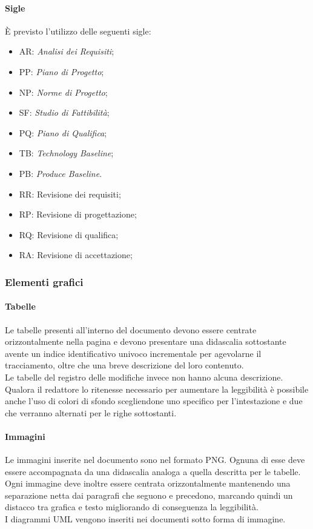 		\paragraph{Sigle} \Spazio
		È previsto l’utilizzo delle seguenti sigle:
		\begin{itemize}
			\item AR: \textit{Analisi dei Requisiti};
			\item PP: \textit{Piano di Progetto};
			\item NP: \textit{Norme di Progetto};
			\item SF: \textit{Studio di Fattibilità};
			\item PQ: \textit{Piano di Qualifica};
			\item TB: \emph{Technology Baseline};
			\item PB: \emph{Produce Baseline}.
			
			
\item RR: Revisione dei requisiti;
			\item RP: Revisione di progettazione;
			\item RQ: Revisione di qualifica;
			\item RA: Revisione di accettazione;
		\end{itemize}
		
	\subsubsection{Elementi grafici}
		\paragraph{Tabelle}\Spazio
		Le tabelle presenti all'interno del documento devono essere centrate orizzontalmente nella pagina e devono presentare una didascalia sottostante avente un indice identificativo univoco incrementale per agevolarne il tracciamento, oltre che una breve descrizione del loro contenuto.\\
		Le tabelle del registro delle modifiche invece non hanno alcuna descrizione.
Qualora il redattore lo ritenesse necessario per aumentare la leggibilità è possibile anche l'uso di colori di sfondo scegliendone uno specifico per l'intestazione e due che verranno alternati per le righe sottostanti.

		\paragraph{Immagini}\Spazio
		Le immagini inserite nel documento sono nel formato PNG. Ognuna di esse deve essere accompagnata da una didascalia analoga a quella descritta per le tabelle. \\
		Ogni immagine deve inoltre essere centrata orizzontalmente mantenendo una separazione netta dai paragrafi che seguono e precedono, marcando quindi un distacco tra grafica e testo migliorando di conseguenza la leggibilità. \\
		I diagrammi UML vengono inseriti nei documenti sotto forma di immagine.
